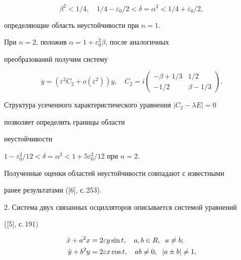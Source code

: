 $$ 


\beta^2<1/4,\quad 1/4-\varepsilon_0/2<\delta=\alpha^2<1/4+ 


\varepsilon_0/2, 


$$ 


определяющие область неустойчивости при $n=1$. 


 


При $n=2$, положив $\alpha=1+\varepsilon^2_0\beta$, после аналогичных 


преобразований получим систему 


$$ 


\Dot y=(\varepsilon^2C_2+o(\varepsilon^2))y,\quad C_2=i 


\begin{pmatrix} 


-\beta+1/3 & 1/2 \\ -1/2 & \beta-1/3 


\end{pmatrix} 


. 


$$ 


Структура усеченного характеристического уравнения $|C_2-\lambda E|=0$ 


позволяет определить границы области  


неустойчивости 


$1-\varepsilon^2_0/12<\delta=\alpha^2<1+5\varepsilon^2_0/12$ при $n=2$. 


 


Полученные оценки областей неустойчивости совпадают с известными 


ранее результатами ([6], с.\,253). 


 


2. Система двух связанных осцилляторов описывается системой уравнений 


([5], с.\,191) 


\begin{equation} 


\begin{split} 


\Ddot x+a^2x&=2\varepsilon y\sin t,\quad a,b\in R, 


\ \; a\ne b;\\ 


\Ddot y+b^2y&=2\varepsilon x\cos t,\quad a b\ne0,\ \; |a\pm b|\ne1, 


\end{split} 


\end{equation} 


